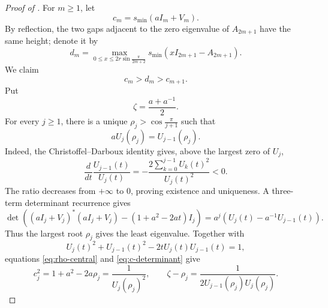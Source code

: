 \documentclass[12pt,anonymous]{iopjournal}
\numberwithin{equation}{section}
\theoremstyle{remark}
\begin{document}
\begin{proof}[Proof of ]
For \(m\geq1\), let
\begin{equation}\label{eq:c-height-def}
 c_m=s_{\min}(aI_m+V_m).
\end{equation}
By reflection, the two gaps adjacent to the zero eigenvalue of
\(A_{2m+1}\) have the same height; denote it by
\begin{equation}\label{eq:d-height-def}
 d_m=\max_{0\leq x\leq2r\sin\frac{\pi}{2m+2}}
 s_{\min}(xI_{2m+1}-A_{2m+1}).
\end{equation}
We claim
\begin{equation}\label{eq:central-interlace}
 c_m>d_m>c_{m+1}.
\end{equation}
Put
\[
 \zeta=\frac{a+a^{-1}}2.
\]
For every \(j\geq1\), there is a unique
\(\rho_j>\cos\frac{\pi}{j+1}\) such that
\begin{equation}\label{eq:rho-central}
 aU_j(\rho_j)=U_{j-1}(\rho_j).
\end{equation}
Indeed, the Christoffel--Darboux identity gives, above the largest zero
of \(U_j\),
\[
 \frac{d}{dt}\frac{U_{j-1}(t)}{U_j(t)}
 =-\frac{2\sum_{k=0}^{j-1}U_k(t)^2}{U_j(t)^2}<0.
\]
The ratio decreases from \(+\infty\) to \(0\), proving existence and
uniqueness.  A three-term determinant recurrence gives
\begin{equation}\label{eq:c-determinant}
 \det\left((aI_j+V_j)^*(aI_j+V_j)
 -(1+a^2-2at)I_j\right)
 =a^j\left(U_j(t)-a^{-1}U_{j-1}(t)\right).
\end{equation}
Thus the largest root \(\rho_j\) gives the least eigenvalue.  Together
with
\[
 U_j(t)^2+U_{j-1}(t)^2-2tU_j(t)U_{j-1}(t)=1,
\]
equations \eqref{eq:rho-central} and \eqref{eq:c-determinant} give
\begin{equation}\label{eq:c-rho-identities}
 c_j^2=1+a^2-2a\rho_j=\frac1{U_j(\rho_j)^2},\qquad
 \zeta-\rho_j=\frac1{2U_{j-1}(\rho_j)U_j(\rho_j)}.
\end{equation}


\end{proof}
\end{document}
